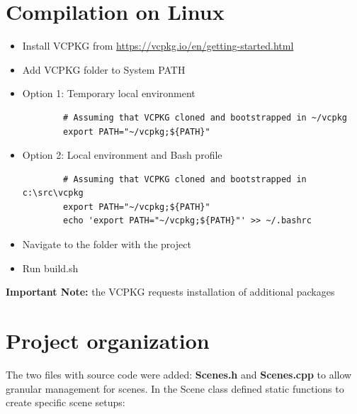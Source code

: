 \documentclass[12pt,a4paper,english]{article}
\begin{document}
\section{Compilation on Linux}

\begin{itemize}
    \item Install VCPKG from \url{https://vcpkg.io/en/getting-started.html}
    \item Add VCPKG folder to System PATH
    \item Option 1: Temporary local environment
    \begin{verbatim}
        # Assuming that VCPKG cloned and bootstrapped in ~/vcpkg
        export PATH="~/vcpkg;${PATH}"
    \end{verbatim}

    \item Option 2: Local environment and Bash profile
    \begin{verbatim}
        # Assuming that VCPKG cloned and bootstrapped in c:\src\vcpkg
        export PATH="~/vcpkg;${PATH}"
        echo 'export PATH="~/vcpkg;${PATH}"' >> ~/.bashrc
    \end{verbatim}

    \item Navigate to the folder with the project
    \item Run build.sh
\end{itemize}
\textbf{Important Note:} the VCPKG requests installation of additional packages

\section{Project organization}

The two files with source code were added: \textbf{Scenes.h} and \textbf{Scenes.cpp} to allow granular management for scenes.
In the Scene class defined static functions to create specific scene setups:
\end{document}
